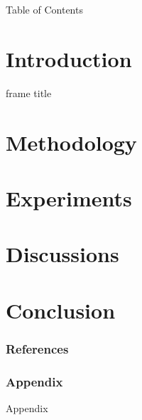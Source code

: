 \documentclass[10pt, mathserif, hyperref={hidelinks,colorlinks=true,linkcolor=theme_color,citecolor=blue},xcolor={dvipsnames},aspectratio=169]{beamer}
\begin{document}
\begin{frame}{Table of Contents}
	\tableofcontents
\end{frame}

\section{Introduction}

\begin{frame}
	\tableofcontents[currentsection]
\end{frame}

\begin{frame}{frame title}
\end{frame}

\section{Methodology}

\begin{frame}
	\tableofcontents[currentsection]
\end{frame}

\section{Experiments}

\begin{frame}
	\tableofcontents[currentsection]
\end{frame}

\section{Discussions}

\begin{frame}
	\tableofcontents[currentsection]
\end{frame}

\section{Conclusion}

\begin{frame}
	\tableofcontents[currentsection]
\end{frame}

\begin{frame}[t,allowframebreaks]
	\frametitle{References}
	
\end{frame}

\begin{frame}
	\frametitle{Appendix}
	Appendix
\end{frame}
\end{document}
